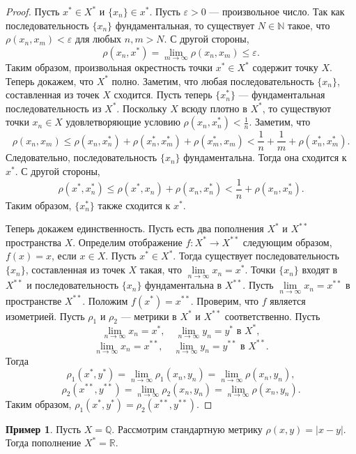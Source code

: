 \documentclass[12pt, titlepage, oneside]{amsbook}
\newcommand{\NN}{\mathbb{N}}
\newcommand{\RR}{\mathbb{R}}
\newcommand{\QQ}{\mathbb{Q}}
\theoremstyle{definition}
\newtheorem{example}[theorem]{Пример}
\theoremstyle{remark}
\begin{document}
\begin{proof}
Пусть $x^*\in X^*$ и $\{x_n\}\in x^*$. Пусть $\varepsilon>0$ --- произвольное число. Так как последовательность $\{x_n\}$ фундаментальная, то существует $N\in\NN$ такое, что $\rho(x_n,x_m)<\varepsilon$ для любых $n,m>N$. С другой стороны, $$\rho(x_n,x^*)=\lim\limits_{m\rightarrow\infty}\rho(x_n,x_m)\leq\varepsilon.$$ Таким образом, произвольная окрестность точки $x^*\in X^*$ содержит точку $X$. Теперь докажем, что $X^*$ полно. Заметим, что любая последовательность $\{x_n\}$, составленная из точек $X$ сходится. Пусть теперь $\{x^*_n\}$ --- фундаментальная последовательность из $X^*$. Поскольку $X$ всюду плотно в $X^*$, то существуют точки $x_n\in X$ удовлетворяющие условию $\rho(x_n,x^*_n)<\frac{1}{n}$. Заметим, что $$\rho(x_n,x_m)\leq\rho(x_n,x^*_n)+\rho(x^*_n,x^*_m)+\rho(x^*_m,x_m)<\frac{1}{n}+\frac{1}{m}+\rho(x^*_n,x^*_m).$$ Следовательно, последовательность $\{x_n\}$ фундаментальна. Тогда она сходится к $x^*$. С другой стороны, $$\rho(x^*,x^*_n)\leq\rho(x^*,x_n)+\rho(x_n,x^*_n)<\frac{1}{n}+\rho(x_n,x^*_n).$$ Таким образом, $\{x^*_n\}$ также сходится к $x^*$.

Теперь докажем единственность. Пусть есть два пополнения $X^*$ и $X^{**}$ пространства $X$. Определим отображение $f\colon X^*\rightarrow X^{**}$ следующим образом, $f(x)=x$, если $x\in X$. Пусть $x^*\in X^*$. Тогда существует последовательность $\{x_n\}$, составленная из точек $X$ такая, что $\lim\limits_{n\rightarrow\infty} x_n=x^*$. Точки $\{x_n\}$ входят в $X^{**}$ и последовательность $\{x_n\}$ фундаментальна в $X^{**}$. Пусть $\lim\limits_{n\rightarrow\infty} x_n=x^{**}$ в пространстве $X^{**}$. Положим $f(x^*)=x^{**}.$ Проверим, что $f$ является изометрией. Пусть $\rho_1$ и $\rho_2$ --- метрики в $X^*$ и $X^{**}$ соответственно. Пусть $$\lim\limits_{n\rightarrow\infty} x_n=x^*,\quad \lim\limits_{n\rightarrow\infty} y_n=y^*\text{ в } X^*,$$ $$\lim\limits_{n\rightarrow\infty} x_n=x^{**},\quad \lim\limits_{n\rightarrow\infty} y_n=y^{**}\text{ в } X^{**}.$$ Тогда $$\rho_1(x^*,y^*)=\lim\limits_{n\rightarrow\infty}\rho_1(x_n,y_n)=\lim\limits_{n\rightarrow\infty}\rho(x_n,y_n),$$ $$\rho_2(x^{**},y^{**})=\lim\limits_{n\rightarrow\infty}\rho_2(x_n,y_n)=\lim\limits_{n\rightarrow\infty}\rho(x_n,y_n).$$ Таким образом, $\rho_1(x^*,y^*)=\rho_2(x^{**},y^{**})$.
\end{proof}

\begin{example}
Пусть $X=\QQ$. Рассмотрим стандартную метрику $\rho(x,y)=|x-y|$. Тогда пополнение $X^*=\RR$.
\end{example}
\end{document}
